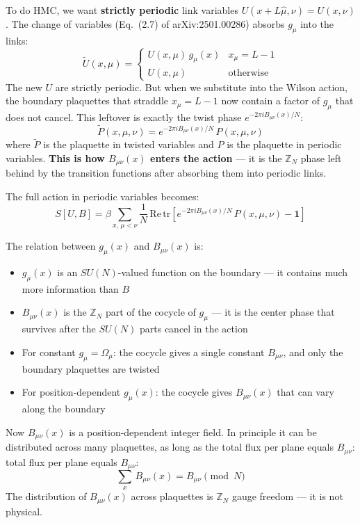 \documentclass[12pt,a4paper]{article}
\begin{document}
To do HMC, we want \textbf{strictly periodic} link variables $U(x{+}L\hat\mu,\nu) = U(x,\nu)$.
The change of variables (Eq.~(2.7) of arXiv:2501.00286) absorbs $g_\mu$ into the links:
\begin{equation}
  \tilde U(x,\mu) = \begin{cases}
    U(x,\mu)\,g_\mu(x) & x_\mu = L{-}1 \\
    U(x,\mu) & \text{otherwise}
  \end{cases}
\end{equation}
The new $U$ are strictly periodic. But when we substitute into the Wilson action,
the boundary plaquettes that straddle $x_\mu = L{-}1$ now contain a factor of $g_\mu$
that does not cancel. This leftover is exactly the twist phase $e^{-2\pi iB_{\mu\nu}(x)/N}$:
\begin{equation}
  \tilde P(x,\mu,\nu) = e^{-2\pi iB_{\mu\nu}(x)/N}\,P(x,\mu,\nu)
\end{equation}
where $\tilde P$ is the plaquette in twisted variables and $P$ is the plaquette
in periodic variables.
\textbf{This is how $B_{\mu\nu}(x)$ enters the action} ---
it is the $\mathbb{Z}_N$ phase left behind by the transition functions
after absorbing them into periodic links.

The full action in periodic variables becomes:
\begin{equation}
  S[U,B] = \beta\sum_{x,\,\mu<\nu}\frac{1}{N}\,\mathrm{Re}\,\mathrm{tr}\!\left[
    e^{-2\pi i B_{\mu\nu}(x)/N}\,P(x,\mu,\nu) - \mathbf{1}
  \right]
\end{equation}

The relation between $g_\mu(x)$ and $B_{\mu\nu}(x)$ is:
\begin{itemize}
  \item $g_\mu(x)$ is an $SU(N)$-valued function on the boundary ---
        it contains much more information than $B$
  \item $B_{\mu\nu}(x)$ is the $\mathbb{Z}_N$ part of the cocycle of $g_\mu$ ---
        it is the center phase that survives after the $SU(N)$ parts cancel in the action
  \item For constant $g_\mu = \Omega_\mu$: the cocycle gives a single constant $B_{\mu\nu}$,
        and only the boundary plaquettes are twisted
  \item For position-dependent $g_\mu(x)$: the cocycle gives $B_{\mu\nu}(x)$
        that can vary along the boundary
\end{itemize}

Now $B_{\mu\nu}(x)$ is a position-dependent integer field.
In principle it can be distributed across many plaquettes, as long as the
total flux per plane equals $B_{\mu\nu}$:
total flux per plane equals $B_{\mu\nu}$:
\begin{equation}
  \sum_{x}\,B_{\mu\nu}(x) = B_{\mu\nu} \pmod{N}
\end{equation}
The distribution of $B_{\mu\nu}(x)$ across plaquettes is $\mathbb{Z}_N$ gauge freedom ---
it is not physical.
\end{document}
